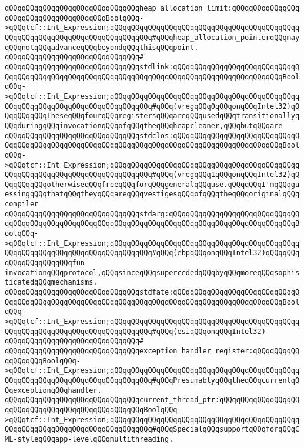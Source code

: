 \verb|qQQqqQQqqQQqqQQqqQQqqQQqqQQqqQQqheap_allocation_limit:qQQqqQQqqQQqqQQqqQQqqQQqqQQqqQQqqQQqqQQqBoolqQQq->qQQqtcf::Int_Expression;qQQqqQQqqQQqqQQqqQQqqQQqqQQqqQQqqQQqqQQqqQQqqQQqqQQqqQQqqQQqqQQqqQQqqQQqqQQqqQQq#qQQqheap_allocation_pointerqQQqmayqQQqnotqQQqadvanceqQQqbeyondqQQqthisqQQqpoint.|\newline
\verb|qQQqqQQqqQQqqQQqqQQqqQQqqQQqqQQq#|\newline
\verb|qQQqqQQqqQQqqQQqqQQqqQQqqQQqqQQqstdlink:qQQqqQQqqQQqqQQqqQQqqQQqqQQqqQQqqQQqqQQqqQQqqQQqqQQqqQQqqQQqqQQqqQQqqQQqqQQqqQQqqQQqqQQqqQQqqQQqBoolqQQq->qQQqtcf::Int_Expression;qQQqqQQqqQQqqQQqqQQqqQQqqQQqqQQqqQQqqQQqqQQqqQQqqQQqqQQqqQQqqQQqqQQqqQQqqQQqqQQq#qQQq(vregqQQq0qQQqonqQQqIntel32)qQQqqQQqqQQqTheseqQQqfourqQQqregistersqQQqareqQQqusedqQQqtransitionallyqQQqduringqQQqinvocationqQQqofqQQqtheqQQqheapcleaner,qQQqbutqQQqare|\newline
\verb|qQQqqQQqqQQqqQQqqQQqqQQqqQQqqQQqstdclos:qQQqqQQqqQQqqQQqqQQqqQQqqQQqqQQqqQQqqQQqqQQqqQQqqQQqqQQqqQQqqQQqqQQqqQQqqQQqqQQqqQQqqQQqqQQqqQQqBoolqQQq->qQQqtcf::Int_Expression;qQQqqQQqqQQqqQQqqQQqqQQqqQQqqQQqqQQqqQQqqQQqqQQqqQQqqQQqqQQqqQQqqQQqqQQqqQQqqQQq#qQQq(vregqQQq1qQQqonqQQqIntel32)qQQqqQQqqQQqotherwiseqQQqfreeqQQqforqQQqgeneralqQQquse.qQQqqQQqI'mqQQqguessingqQQqthatqQQqtheyqQQqareqQQqvestigesqQQqofqQQqtheqQQqoriginalqQQqcompiler|\newline
\verb|qQQqqQQqqQQqqQQqqQQqqQQqqQQqqQQqstdarg:qQQqqQQqqQQqqQQqqQQqqQQqqQQqqQQqqQQqqQQqqQQqqQQqqQQqqQQqqQQqqQQqqQQqqQQqqQQqqQQqqQQqqQQqqQQqqQQqqQQqBoolqQQq->qQQqtcf::Int_Expression;qQQqqQQqqQQqqQQqqQQqqQQqqQQqqQQqqQQqqQQqqQQqqQQqqQQqqQQqqQQqqQQqqQQqqQQqqQQqqQQq#qQQq(ebpqQQqonqQQqIntel32)qQQqqQQqqQQqqQQqqQQqqQQqfun-invocationqQQqprotocol,qQQqsinceqQQqsupercededqQQqbyqQQqmoreqQQqsophisticatedqQQqmechanisms.|\newline
\verb|qQQqqQQqqQQqqQQqqQQqqQQqqQQqqQQqstdfate:qQQqqQQqqQQqqQQqqQQqqQQqqQQqqQQqqQQqqQQqqQQqqQQqqQQqqQQqqQQqqQQqqQQqqQQqqQQqqQQqqQQqqQQqqQQqqQQqBoolqQQq->qQQqtcf::Int_Expression;qQQqqQQqqQQqqQQqqQQqqQQqqQQqqQQqqQQqqQQqqQQqqQQqqQQqqQQqqQQqqQQqqQQqqQQqqQQqqQQq#qQQq(esiqQQqonqQQqIntel32)|\newline
\verb|qQQqqQQqqQQqqQQqqQQqqQQqqQQqqQQq#|\newline
\verb|qQQqqQQqqQQqqQQqqQQqqQQqqQQqqQQqexception_handler_register:qQQqqQQqqQQqqQQqqQQqBoolqQQq->qQQqtcf::Int_Expression;qQQqqQQqqQQqqQQqqQQqqQQqqQQqqQQqqQQqqQQqqQQqqQQqqQQqqQQqqQQqqQQqqQQqqQQqqQQqqQQq#qQQqPresumablyqQQqtheqQQqcurrentqQQqexceptionqQQqhandler.|\newline
\verb|qQQqqQQqqQQqqQQqqQQqqQQqqQQqqQQqcurrent_thread_ptr:qQQqqQQqqQQqqQQqqQQqqQQqqQQqqQQqqQQqqQQqqQQqqQQqqQQqBoolqQQq->qQQqtcf::Int_Expression;qQQqqQQqqQQqqQQqqQQqqQQqqQQqqQQqqQQqqQQqqQQqqQQqqQQqqQQqqQQqqQQqqQQqqQQqqQQqqQQq#qQQqSpecialqQQqsupportqQQqforqQQqCML-styleqQQqapp-levelqQQqmultithreading.|\newline
